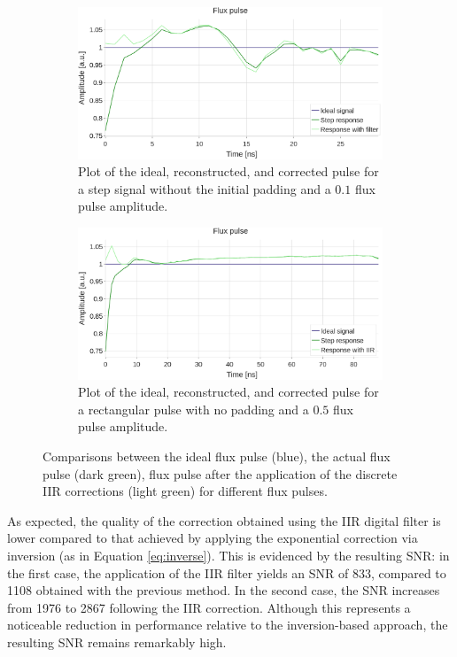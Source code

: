 \begin{figure}[h!]
    \centering
    \begin{subfigure}[t]{0.495\textwidth}
        \includegraphics[width=\textwidth]{figures/png/Cryoscope/filters/IIR_nopad.png}
        \caption{Plot of the ideal, reconstructed, and corrected pulse for a step signal without the initial padding and a $0.1$ flux pulse amplitude.}
        \label{fig:IIR:nopad}
    \end{subfigure}
    \hfill
    \begin{subfigure}[t]{0.495\textwidth}
        \includegraphics[width=\textwidth]{figures/png/Cryoscope/filters_long/IIR.png}
        \caption{Plot of the ideal, reconstructed, and corrected pulse for a rectangular pulse with no padding and a $0.5$ flux pulse amplitude.}
        \label{fig:IIR:long}
    \end{subfigure}
    \caption{Comparisons between the ideal flux pulse (blue), the actual flux pulse (dark green), flux pulse after the application of the discrete IIR corrections (light green) for different flux pulses.}
    \label{fig:IIR}
\end{figure}

As expected, the quality of the correction obtained using the IIR digital filter is lower compared to that achieved by applying the exponential correction via inversion (as in Equation \ref{eq:inverse}). 
This is evidenced by the resulting SNR: in the first case, the application of the IIR filter yields an SNR of 833, compared to 1108 obtained with the previous method.
In the second case, the SNR increases from 1976 to 2867 following the IIR correction. 
Although this represents a noticeable reduction in performance relative to the inversion-based approach, the resulting SNR remains remarkably high.

